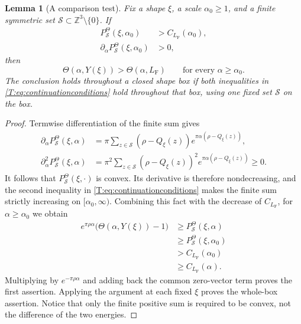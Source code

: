 \documentclass[reqno,english]{amsart}
\newtheorem{lemma}[theorem]{Lemma}
\theoremstyle{definition}
\newtheorem{open problem}[theorem]{Open Problem}
\theoremstyle{remark}
\theoremstyle{plain}
\numberwithin{equation}{section}
\newcommand{\Z}{\mathbb Z}
\newcommand{\FCC}{L_{\mathrm F}}
\newcommand{\Th}{\Theta}
\begin{document}
\begin{lemma}[A comparison test]\label{T:lem:continuation}
Fix a shape $\xi$, a scale $\alpha_0\ge1$, and a finite symmetric set
$\mathcal S\subset\Z^3\setminus\{0\}$. If
\begin{equation}\label{T:eq:continuationconditions}
 \begin{aligned}
 P^{\Theta}_{\mathcal S}(\xi,\alpha_0)
     &>C_{\FCC}(\alpha_0),\\
 \partial_\alpha P^{\Theta}_{\mathcal S}(\xi,\alpha_0)
     &>0,
 \end{aligned}
\end{equation}
then
\[
 \Th(\alpha,Y(\xi))>\Th(\alpha,\FCC)
 \qquad\text{for every }\alpha\ge\alpha_0.
\]
The conclusion holds throughout a closed shape box if both inequalities
in \eqref{T:eq:continuationconditions} hold throughout that box, using
one fixed set $\mathcal S$ on the box.
\end{lemma}
\begin{proof}
Termwise differentiation of the finite sum gives
\begin{align*}
 \partial_\alpha P^{\Theta}_{\mathcal S}(\xi,\alpha)
 &=\pi\sum_{z\in\mathcal S}(\rho-Q_\xi(z))
       e^{\pi\alpha(\rho-Q_\xi(z))},\\
 \partial_\alpha^2 P^{\Theta}_{\mathcal S}(\xi,\alpha)
 &=\pi^2\sum_{z\in\mathcal S}(\rho-Q_\xi(z))^2
       e^{\pi\alpha(\rho-Q_\xi(z))}\ge0.
\end{align*}
It follows that $P^{\Theta}_{\mathcal S}(\xi,\cdot)$ is convex.
Its derivative is therefore nondecreasing, and the second inequality
in \eqref{T:eq:continuationconditions} makes the finite sum strictly
increasing on $[\alpha_0,\infty)$. Combining this fact with the
decrease of $C_{\FCC}$, for $\alpha\ge\alpha_0$ we obtain
\[
 \begin{aligned}
 e^{\pi\rho\alpha}\bigl(\Th(\alpha,Y(\xi))-1\bigr)
 &\ge P^{\Theta}_{\mathcal S}(\xi,\alpha)\\
 &\ge P^{\Theta}_{\mathcal S}(\xi,\alpha_0)\\
 &>C_{\FCC}(\alpha_0)\\
 &\ge C_{\FCC}(\alpha).
 \end{aligned}
\]
Multiplying by $e^{-\pi\rho\alpha}$ and adding back the common
zero-vector term proves the first assertion. Applying the argument at
each fixed $\xi$ proves the whole-box assertion. Notice that only the
finite positive sum is required to be convex, not the difference of
the two energies.
\end{proof}
\end{document}
